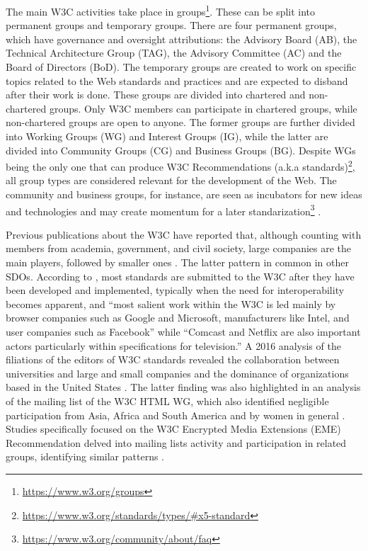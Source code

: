 \documentclass[sigconf, nonacm]{acmart}              %
\begin{document}
The main W3C activities take place in groups\footnote{\url{https://www.w3.org/groups}}. These can be split into permanent groups and temporary groups. There are four permanent groups, which have governance and oversight attributions: the Advisory Board (AB), the Technical Architecture Group (TAG), the Advisory Committee (AC) and the Board of Directors (BoD). The temporary groups are created to work on specific topics related to the Web standards and practices and are expected to disband after their work is done. These groups are divided into chartered and non-chartered groups. Only W3C members can participate in chartered groups, while non-chartered groups are open to anyone. The former groups are further divided into Working Groups (WG) and Interest Groups (IG), while the latter are divided into Community Groups (CG) and Business Groups (BG). Despite WGs being the only one that can produce W3C Recommendations (a.k.a standards)\footnote{\url{https://www.w3.org/standards/types/\#x5-standard}}, all group types are considered relevant for the development of the Web. The community and business groups, for instance, are seen as incubators for new ideas and technologies and may create momentum for a later standarization\footnote{\url{https://www.w3.org/community/about/faq}} \cite{Harcourt2020}.

Previous publications about the W3C have reported that, although counting with members from academia, government, and civil society, large companies are the main players, followed by smaller ones \cite{Gamalielsson2016, Halpin2017, Harcourt2020, Mason2019}. The latter pattern in common in other SDOs. According to \cite{Harcourt2020}, most standards are submitted to the W3C after they have been developed and implemented, typically when the need for interoperability becomes apparent, and ``most salient work within the W3C is led mainly by browser companies such as Google and Microsoft, manufacturers like Intel, and user companies such as Facebook'' while ``Comcast and Netflix are also important actors particularly within specifications for television.'' A 2016 analysis of the filiations of the editors of W3C standards revealed the collaboration between universities and large and small companies and the dominance of organizations based in the United States \cite{Gamalielsson2016}. The latter finding was also highlighted in an analysis of the mailing list of the W3C HTML WG, which also identified negligible participation from Asia, Africa and South America and by women in general \cite{Gupta2016}. Studies specifically focused on the W3C Encrypted Media Extensions (EME) Recommendation delved into mailing lists activity and participation in related groups, identifying similar patterns \cite{Halpin2017, Mason2019}.
\end{document}
